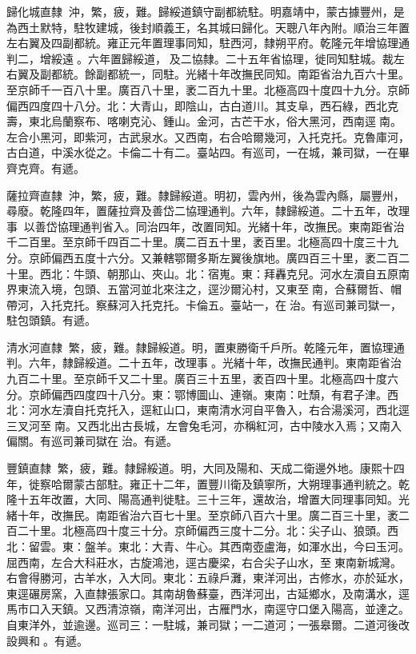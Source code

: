 \begin{pinyinscope}
歸化城直隸：沖，繁，疲，難。歸綏道鎮守副都統駐。明嘉靖中，蒙古據豐州，是為西土默特，駐牧建城，後封順義王，名其城曰歸化。天聰八年內附。順治三年置左右翼及四副都統。雍正元年置理事同知，駐西河，隸朔平府。乾隆元年增協理通判二，增綏遠。六年置歸綏道，及二協隸。二十五年省協理，徙同知駐城。裁左右翼及副都統。餘副都統一，同駐。光緒十年改撫民同知。南距省治九百六十里。至京師千一百八十里。廣百八十里，袤二百九十里。北極高四十度四十九分。京師偏西四度四十八分。北：大青山，即陰山，古白道川。其支阜，西石綠，西北克壽，東北烏蘭察布、喀喇克沁、鍾山。金河，古芒干水，俗大黑河，西南逕南。左合小黑河，即紫河，古武泉水。又西南，右合哈爾幾河，入托克托。克魯庫河，古白道，中溪水從之。卡倫二十有二。臺站四。有巡司，一在城，兼司獄，一在畢齊克齊。有遞。

薩拉齊直隸：沖，繁，疲，難。隸歸綏道。明初，雲內州，後為雲內縣，屬豐州，尋廢。乾隆四年，置薩拉齊及善岱二協理通判。六年，隸歸綏道。二十五年，改理事，以善岱協理通判省入。同治四年，改置同知。光緒十年，改撫民。東南距省治千二百里。至京師千四百二十里。廣二百五十里，袤百里。北極高四十度三十九分。京師偏西五度十六分。又兼轄鄂爾多斯左翼後旗地。廣四百三十里，袤二百二十里。西北：牛頭、朝那山、夾山。北：宿嵬。東：拜轟克兒。河水左瀆自五原南界東流入境，包頭、五當河並北來注之，逕沙爾沁村，又東至南，合蘇爾哲、帽帶河，入托克托。察蘇河入托克托。卡倫五。臺站一，在治。有巡司兼司獄一，駐包頭鎮。有遞。

清水河直隸：繁，疲，難。隸歸綏道。明，置東勝衛千戶所。乾隆元年，置協理通判。六年，隸歸綏道。二十五年，改理事。光緒十年，改撫民通判。東南距省治九百二十里。至京師千又二十里。廣百三十五里，袤百四十里。北極高四十度六分。京師偏西四度四十八分。東：鄂博圖山、連嶺。東南：吐頹，有君子津。西北：河水左瀆自托克托入，逕紅山口，東南清水河自平魯入，右合湯溪河，西北逕三叉河至南。又西北出古長城，左會兔毛河，亦稱紅河，古中陵水入焉；又南入偏關。有巡司兼司獄在治。有遞。

豐鎮直隸：繁，疲，難。隸歸綏道。明，大同及陽和、天成二衛邊外地。康熙十四年，徙察哈爾蒙古部駐。雍正十二年，置豐川衛及鎮寧所，大朔理事通判統之。乾隆十五年改置，大同、陽高通判徙駐。三十三年，還故治，增置大同理事同知。光緒十年，改撫民。南距省治六百七十里。至京師八百六十里。廣二百三十里，袤二百二十里。北極高四十度三十分。京師偏西三度十二分。北：尖子山、狼頭。西北：留雲。東：盤羊。東北：大青、牛心。其西南壺盧海，如渾水出，今曰玉河。屈西南，左合大科莊水，古旋鴻池，逕古慶梁，右合尖子山水，至東南新城灣。右會得勝河，古羊水，入大同。東北：五祿戶灘，東洋河出，古修水，亦於延水，東逕碾房窯，入直隸張家口。其南胡魯蘇臺，西洋河出，古延鄉水，及南溝水，逕馬市口入天鎮。又西清涼嶺，南洋河出，古雁門水，南逕守口堡入陽高，並達之。自東洋外，並逾邊。巡司三：一駐城，兼司獄；一二道河；一張皋爾。二道河後改設興和。有遞。


\end{pinyinscope}
